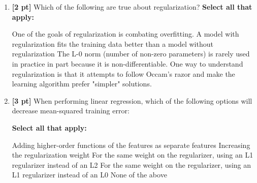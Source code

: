 \documentclass[12pt,addpoints,answers]{exam}
\begin{document}
\begin{enumerate}
        
    \item \textbf{[2 pt]} Which of the following are true about regularization?
    \textbf{Select all that apply:}
    {%
    \checkboxchar{$\Box$} \checkedchar{$\blacksquare$}
    \begin{checkboxes}
        \choice One of the goals of regularization is combating overfitting.  
        \choice A model with regularization fits the training data better than a model without regularization 
        \choice The L-0 norm (number of non-zero parameters) is rarely used in practice in part because it is non-differentiable. 
        \choice One way to understand regularization is that it attempts to follow Occam's razor and make the learning algorithm prefer "simpler" solutions.
    \end{checkboxes}
    }
    
    \item \textbf{[3 pt]} When performing linear regression, which of the following options will decrease mean-squared training error:
    
    \textbf{Select all that apply:}
        {%
    \checkboxchar{$\Box$} \checkedchar{$\blacksquare$}
        \begin{checkboxes}
        \choice Adding higher-order functions of the features as separate features
        \choice Increasing the regularization weight
        \choice For the same weight on the regularizer, using an L1 regularizer instead of an L2
        \choice For the same weight on the regularizer, using an L1 regularizer instead of an L0
        \choice None of the above
        \end{checkboxes}
        }

    
\end{enumerate}




\clearpage
\end{document}
